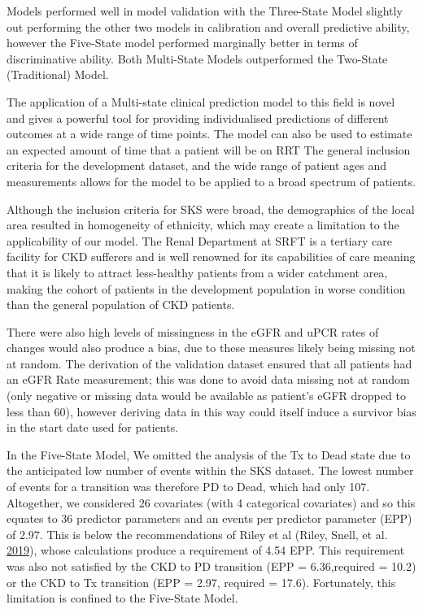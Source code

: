 \documentclass[
]{article}
\begin{document}
Models performed well in model validation with the Three-State Model slightly out performing the other two models in calibration and overall predictive ability, however the Five-State model performed marginally better in terms of discriminative ability. Both Multi-State Models outperformed the Two-State (Traditional) Model.

The application of a Multi-state clinical prediction model to this field is novel and gives a powerful tool for providing individualised predictions of different outcomes at a wide range of time points. The model can also be used to estimate an expected amount of time that a patient will be on RRT The general inclusion criteria for the development dataset, and the wide range of patient ages and measurements allows for the model to be applied to a broad spectrum of patients.

Although the inclusion criteria for SKS were broad, the demographics of the local area resulted in homogeneity of ethnicity, which may create a limitation to the applicability of our model. The Renal Department at SRFT is a tertiary care facility for CKD sufferers and is well renowned for its capabilities of care meaning that it is likely to attract less-healthy patients from a wider catchment area, making the cohort of patients in the development population in worse condition than the general population of CKD patients.

There were also high levels of missingness in the eGFR and uPCR rates of changes would also produce a bias, due to these measures likely being missing not at random. The derivation of the validation dataset ensured that all patients had an eGFR Rate measurement; this was done to avoid data missing not at random (only negative or missing data would be available as patient's eGFR dropped to less than 60), however deriving data in this way could itself induce a survivor bias in the start date used for patients.

In the Five-State Model, We omitted the analysis of the Tx to Dead state due to the anticipated low number of events within the SKS dataset. The lowest number of events for a transition was therefore PD to Dead, which had only 107. Altogether, we considered 26 covariates (with 4 categorical covariates) and so this equates to 36 predictor parameters and an events per predictor parameter (EPP) of 2.97. This is below the recommendations of Riley et al (Riley, Snell, et al. \protect\hyperlink{ref-riley_minimum_2019}{2019}), whose calculations produce a requirement of 4.54 EPP. This requirement was also not satisfied by the CKD to PD transition (EPP = 6.36,required = 10.2) or the CKD to Tx transition (EPP = 2.97, required = 17.6). Fortunately, this limitation is confined to the Five-State Model.
\end{document}
